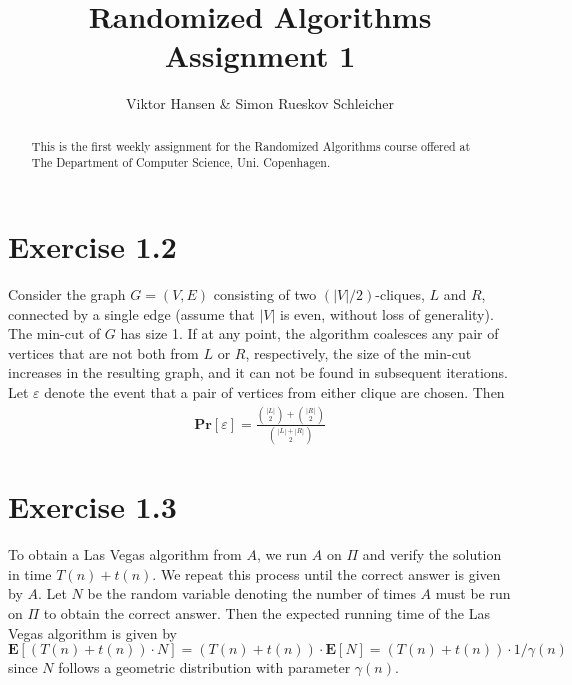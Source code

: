 \documentclass[12pt]{article}
\begin{document}
\nocite{*}


\title{Randomized Algorithms \\
       Assignment 1}

\author{Viktor Hansen & Simon Rueskov Schleicher}

\maketitle

\begin{abstract}
  This is the first weekly assignment for the Randomized Algorithms course offered at The Department of Computer Science, Uni. Copenhagen.
\end{abstract}

\pagebreak

\section*{Exercise 1.2}
Consider the graph $G=(V,E)$ consisting of two $(\left|V\right|/2)$-cliques, $L$ and $R$, connected by a single edge (assume that $|V|$ is even, without loss of generality). The min-cut of $G$ has size 1. If at any point, the algorithm coalesces any pair of vertices that are not both from $L$ or $R$, respectively, the size of the min-cut increases in the resulting graph, and it can not be found in subsequent iterations. Let $\varepsilon$ denote the event that a pair of vertices from either clique are chosen. Then 
\begin{align*}
\mathbf{Pr}\left[ \varepsilon \right] = \frac{\binom{|L|}{2} + \binom{|R|}{2}}{\binom{|L|+|R|}{2}}
\end{align*}

\section*{Exercise 1.3}
To obtain a Las Vegas algorithm from $A$, we run $A$ on $\Pi$ and verify the solution in time $T(n) + t(n)$. We repeat this process until the correct answer is given by $A$. Let $N$ be the random variable denoting the number of times $A$ must be run on $\Pi$ to obtain the correct answer. Then the expected running time of the Las Vegas algorithm is given by $\mathbf{E}\left[ \left(T(n) + t(n)\right) \cdot N \right] = \left(T(n) + t(n)\right) \cdot \mathbf{E} \left[ N \right] = \left(T(n) + t(n)\right) \cdot 1/\gamma{(n)}$ since $N$ follows a geometric distribution with parameter $\gamma{(n)}$.
\end{document}
